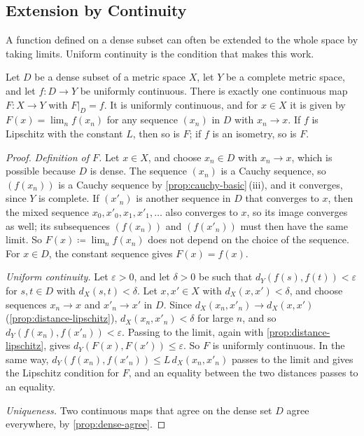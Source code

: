 \subsection{Extension by Continuity}

A function defined on a dense subset can often be extended to the whole space by taking limits. Uniform continuity is the condition that makes this work.

\begin{theorem}
\label{thm:extension}
Let $D$ be a dense subset of a metric space $X$, let $Y$ be a complete metric space, and let $f\colon D\to Y$ be uniformly continuous. There is exactly one continuous map $F\colon X\to Y$ with $F|_D=f$. It is uniformly continuous, and for $x\in X$ it is given by $F(x)=\lim_nf(x_n)$ for any sequence $(x_n)$ in $D$ with $x_n\to x$. If $f$ is Lipschitz with the constant $L$, then so is $F$; if $f$ is an isometry, so is $F$.
\end{theorem}

\begin{proof}
\emph{Definition of $F$.} Let $x\in X$, and choose $x_n\in D$ with $x_n\to x$, which is possible because $D$ is dense. The sequence $(x_n)$ is a Cauchy sequence, so $(f(x_n))$ is a Cauchy sequence by \cref{prop:cauchy-basic}\,(iii), and it converges, since $Y$ is complete. If $(x'_n)$ is another sequence in $D$ that converges to $x$, then the mixed sequence $x_0,x'_0,x_1,x'_1,\ldots$ also converges to $x$, so its image converges as well; its subsequences $(f(x_n))$ and $(f(x'_n))$ must then have the same limit. So $F(x)\coloneqq\lim_nf(x_n)$ does not depend on the choice of the sequence. For $x\in D$, the constant sequence gives $F(x)=f(x)$.

\emph{Uniform continuity.} Let $\varepsilon>0$, and let $\delta>0$ be such that $d_Y(f(s),f(t))<\varepsilon$ for $s,t\in D$ with $d_X(s,t)<\delta$. Let $x,x'\in X$ with $d_X(x,x')<\delta$, and choose sequences $x_n\to x$ and $x'_n\to x'$ in $D$. Since $d_X(x_n,x'_n)\to d_X(x,x')$ (\cref{prop:distance-lipschitz}), $d_X(x_n,x'_n)<\delta$ for large $n$, and so $d_Y(f(x_n),f(x'_n))<\varepsilon$. Passing to the limit, again with \cref{prop:distance-lipschitz}, gives $d_Y(F(x),F(x'))\le\varepsilon$. So $F$ is uniformly continuous. In the same way, $d_Y(f(x_n),f(x'_n))\le L\,d_X(x_n,x'_n)$ passes to the limit and gives the Lipschitz condition for $F$, and an equality between the two distances passes to an equality.

\emph{Uniqueness.} Two continuous maps that agree on the dense set $D$ agree everywhere, by \cref{prop:dense-agree}.
\end{proof}


